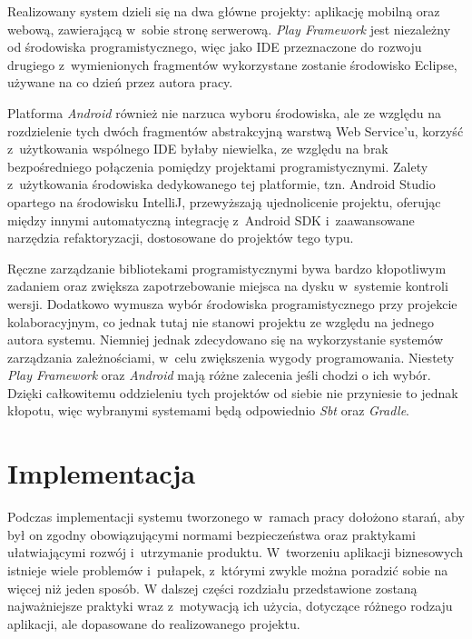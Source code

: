 \documentclass[11pt]{aghdpl}
\begin{document}
Realizowany system dzieli się na dwa główne projekty: aplikację mobilną oraz webową, zawierającą w~sobie stronę serwerową. \emph{Play Framework} jest niezależny od środowiska programistycznego, więc jako IDE przeznaczone do rozwoju drugiego z~wymienionych fragmentów wykorzystane zostanie środowisko Eclipse, używane na co dzień przez autora pracy.

Platforma \emph{Android} również nie narzuca wyboru środowiska, ale ze względu na rozdzielenie tych dwóch fragmentów abstrakcyjną warstwą Web Service'u, korzyść z~użytkowania wspólnego IDE byłaby niewielka, ze względu na brak bezpośredniego połączenia pomiędzy projektami programistycznymi. Zalety z~użytkowania środowiska dedykowanego tej platformie, tzn. Android Studio opartego na środowisku IntelliJ, przewyższają ujednolicenie projektu, oferując między innymi automatyczną integrację z~Android SDK i~zaawansowane narzędzia refaktoryzacji, dostosowane do projektów tego typu.

Ręczne zarządzanie bibliotekami programistycznymi bywa bardzo kłopotliwym zadaniem oraz zwiększa zapotrzebowanie miejsca na dysku w~systemie kontroli wersji. Dodatkowo wymusza wybór środowiska programistycznego przy projekcie kolaboracyjnym, co jednak tutaj nie stanowi projektu ze względu na jednego autora systemu. Niemniej jednak zdecydowano się na wykorzystanie systemów zarządzania zależnościami, w~celu zwiększenia wygody programowania. Niestety \emph{Play Framework} oraz \emph{Android} mają różne zalecenia jeśli chodzi o ich wybór. Dzięki całkowitemu oddzieleniu tych projektów od siebie nie przyniesie to jednak kłopotu, więc wybranymi systemami będą odpowiednio \emph{Sbt} oraz \emph{Gradle}.


\chapter{Implementacja}
\label{cha:implementacja}


Podczas implementacji systemu tworzonego w~ramach pracy dołożono starań, aby był on zgodny obowiązującymi normami bezpieczeństwa oraz praktykami ułatwiającymi rozwój i~utrzymanie produktu. W~tworzeniu aplikacji biznesowych istnieje wiele problemów i~pułapek, z~którymi zwykle można poradzić sobie na więcej niż jeden sposób. W dalszej części rozdziału przedstawione zostaną najważniejsze praktyki wraz z~motywacją ich użycia, dotyczące różnego rodzaju aplikacji, ale dopasowane do realizowanego projektu.
\end{document}
